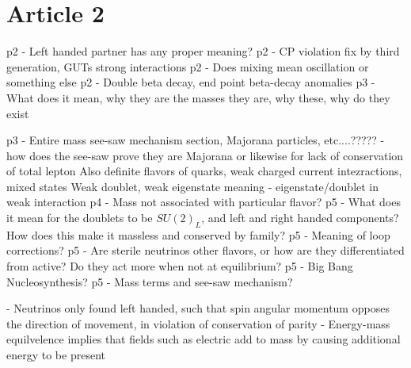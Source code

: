 \documentclass[11 pt, twoside]{article}
\newenvironment{outline*}
{
	\begin{outline}[enumerate]
	}
	{\end{outline}
}
\begin{document}
\section{Article 2}
\begin{outline*}
\1 p2 - Left handed partner has any proper meaning?
\1 p2 - CP violation fix by third generation, GUTs strong interactions
\1 p2 - Does mixing mean oscillation or something else
\1 p2 - Double beta decay, end point beta-decay anomalies
\1 p3 - What does it mean, why they are the masses they are, why these, why do they exist

\1 p3 - Entire mass see-saw mechanism section, Majorana particles, etc....????? - how does the see-saw prove they are Majorana or likewise for lack of conservation of total lepton
\2 Also definite flavors of quarks, weak charged current intezractions, mixed states
\2 Weak doublet, weak eigenstate meaning - eigenstate/doublet in weak interaction
\1 p4 - Mass not associated with particular flavor?
\1 p5 - What does it mean for the doublets to be $SU(2)_L$, and left and right handed components? How does this make it massless and conserved by family?
\1 p5 - Meaning of loop corrections?
\1 p5 - Are sterile neutrinos other flavors, or how are they differentiated from active? Do they act more when not at equilibrium?
\1 p5 - Big Bang Nucleosynthesis?
\1 p5 - Mass terms and see-saw mechanism?
\end{outline*}

- Neutrinos only found left handed, such that spin angular momentum opposes the direction of movement, in violation of conservation of parity
- Energy-mass equilvelence implies that fields such as electric add to mass by causing additional energy to be present
\end{document}

